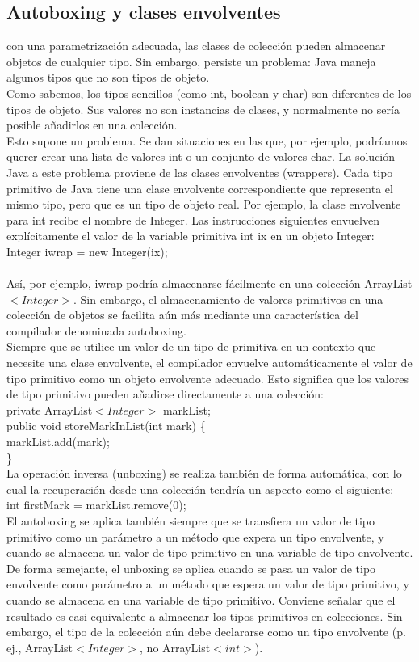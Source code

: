 \documentclass[11pt,a4paper]{article}
\begin{document}
	 \subsection{Autoboxing y clases envolventes}
	 con una parametrización adecuada, las clases de colección pueden almacenar
	 objetos de cualquier tipo. Sin embargo, persiste un problema: Java maneja algunos tipos que no
	 son tipos de objeto.\\
	 Como sabemos, los tipos sencillos (como int, boolean y char) son diferentes de los tipos de
	 objeto. Sus valores no son instancias de clases, y normalmente no sería posible añadirlos en una
	 colección.\\
	 Esto supone un problema. Se dan situaciones en las que, por ejemplo, podríamos querer crear una
	 lista de valores int o un conjunto de valores char.
	 La solución Java a este problema proviene de las clases envolventes (wrappers). Cada tipo primitivo
	 de Java tiene una clase envolvente correspondiente que representa el mismo tipo, pero que es
	 un tipo de objeto real. Por ejemplo, la clase envolvente para int recibe el nombre de Integer. Las instrucciones siguientes envuelven explícitamente el valor de la variable primitiva int ix en
	 un objeto Integer:\\
	 Integer iwrap = new Integer(ix);\\
	 \\
	 Así, por ejemplo, iwrap podría almacenarse fácilmente en una colección ArrayList$<Integer>$.
	 Sin embargo, el almacenamiento de valores primitivos en una colección de objetos se facilita
	 aún más mediante una característica del compilador denominada autoboxing.
	 \\
	 Siempre que se utilice un valor de un tipo de primitiva en un contexto que necesite una
	 clase envolvente, el compilador envuelve automáticamente el valor de tipo primitivo como un
	 objeto envolvente adecuado. Esto significa que los valores de tipo primitivo pueden añadirse
	 directamente a una colección:\\
	 private ArrayList$<Integer>$ markList;\\
	 public void storeMarkInList(int mark)
	 \{\\
	 	markList.add(mark);\\
	 \}\\
	 La operación inversa (unboxing) se realiza también de forma automática, con lo cual la recuperación
	 desde una colección tendría un aspecto como el siguiente:\\
	 int firstMark = markList.remove(0);\\
	 El autoboxing se aplica también siempre que se transfiera un valor de tipo primitivo como un
	 parámetro a un método que expera un tipo envolvente, y cuando se almacena un valor de tipo
	 primitivo en una variable de tipo envolvente. De forma semejante, el unboxing se aplica cuando
	 se pasa un valor de tipo envolvente como parámetro a un método que espera un valor de tipo
	 primitivo, y cuando se almacena en una variable de tipo primitivo. Conviene señalar que el resultado
	 es casi equivalente a almacenar los tipos primitivos en colecciones. Sin embargo, el tipo
	 de la colección aún debe declararse como un tipo envolvente (p. ej., ArrayList$<Integer>$,
	 no ArrayList$<int>$).
\end{document}

